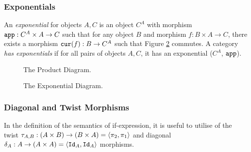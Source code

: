 \subsubsection{Exponentials}
An \textit{exponential} for objects $A, C$ is an object $C^A$ with morphism $\texttt{app}: C^A\times A \rightarrow C$ such that for any object $B$ and morphism $f: B\times A \rightarrow C$, there exists a morphism $\texttt{cur}(f): B \rightarrow C^A$ such that Figure \ref{ExponentialDiagram} commutes. A category \textit{has exponentials} if for all pairs of objects $A, C$, it has an exponential ($C^A$, $\texttt{app}$).

\begin{minipage}{0.47\linewidth}
    \begin{figure}[H]
        \begin{framed}
            \centering
            \begin{center}
            \end{center}
        \end{framed}
        \caption{The Product Diagram.}
        \label{ProductDiagram}
    \end{figure}
\end{minipage}\quad
\begin{minipage}{0.47\linewidth}
    \begin{figure}[H]
        \begin{framed}
            \centering
            \begin{center}
            \end{center}
        \end{framed}
        \caption{The Exponential Diagram.}
        \label{ExponentialDiagram}
    \end{figure}
\end{minipage}


\subsubsection{Diagonal and Twist Morphisms}
In the definition of the semantics of if-expression, it is useful to utilise of the twist $\tau_{A, B}: (A\times B) \rightarrow (B\times A) = \langle\pi_2, \pi_1\rangle$ and diagonal $\delta_{A}: A \rightarrow (A\times A)  = \langle\texttt{Id}_{A}, \texttt{Id}_{A}\rangle$ morphisms.

